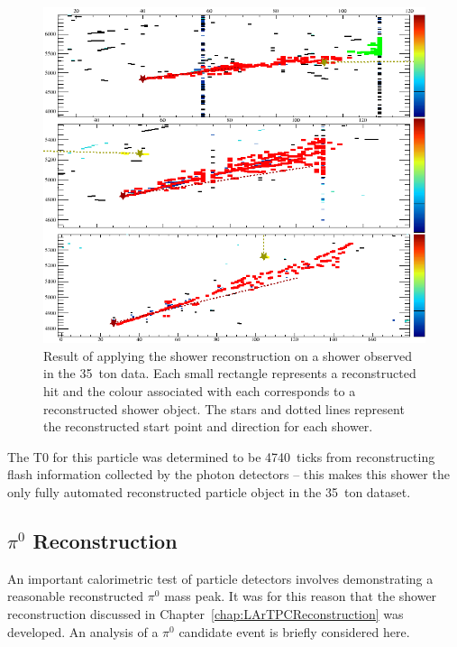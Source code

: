 \begin{figure}
  \centering
  \includegraphics[width=12cm]{FamousShowerReconstructed.png}
  \caption[Result of applying the shower reconstruction on a shower observed in the 35~ton data.]{Result of applying the shower reconstruction on a shower observed in the 35~ton data.  Each small rectangle represents a reconstructed hit and the colour associated with each corresponds to a reconstructed shower object.  The stars and dotted lines represent the reconstructed start point and direction for each shower.}
  \label{fig:FamousShowerReconstructed}
\end{figure}

The T0 for this particle was determined to be 4740~ticks from reconstructing flash information collected by the photon detectors -- this makes this shower the only fully automated reconstructed particle object in the 35~ton dataset.

\subsection{$\pi^0$ Reconstruction}\label{sec:DataPi0Reconstruction}

An important calorimetric test of particle detectors involves demonstrating a reasonable reconstructed $\pi^0$ mass peak.  It was for this reason that the shower reconstruction discussed in Chapter~\ref{chap:LArTPCReconstruction} was developed.  An analysis of a $\pi^0$ candidate event is briefly considered here.

